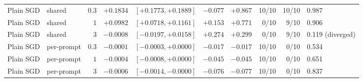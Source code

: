 \begin{tabular}{llrrrrrrrl}
Plain SGD & shared & $0.3$ & $+0.1834$ & $[+0.1773, +0.1889]$ & $-0.077$ & $+0.867$ & 10/10 & 10/10 & 0.987 \\
Plain SGD & shared & $1$ & $+0.0982$ & $[+0.0718, +0.1161]$ & $+0.153$ & $+0.771$ & 0/10 & 9/10 & 0.906 \\
Plain SGD & shared & $3$ & $-0.0008$ & $[-0.0197, +0.0158]$ & $+0.274$ & $+0.299$ & 0/10 & 9/10 & 0.119 (diverged) \\
Plain SGD & per-prompt & $0.3$ & $-0.0001$ & $[-0.0003, +0.0000]$ & $-0.017$ & $-0.017$ & 10/10 & 0/10 & 0.534 \\
Plain SGD & per-prompt & $1$ & $-0.0004$ & $[-0.0008, +0.0000]$ & $-0.045$ & $-0.045$ & 10/10 & 0/10 & 0.651 \\
Plain SGD & per-prompt & $3$ & $-0.0006$ & $[-0.0014, -0.0000]$ & $-0.076$ & $-0.077$ & 10/10 & 0/10 & 0.837 \\
\bottomrule
\end{tabular}%
